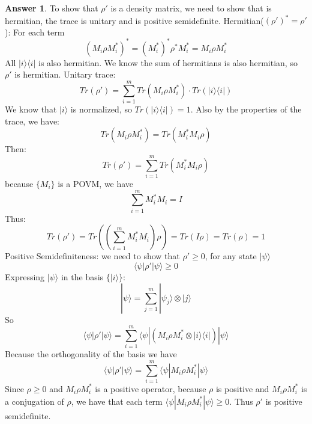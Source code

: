 \documentclass[12pt]{article}
\newcommand{\ket}[1]{|#1\rangle}
\newcommand{\bra}[1]{\langle#1|}
\theoremstyle{plain}
\theoremstyle{definition}
\newtheorem{ans}{Answer}
\begin{document}
\noindent \hrulefill

\begin{ans}
	To show that $\rho'$ is a density matrix, we need to show that is hermitian, the trace is unitary and is positive semidefinite.
    Hermitian($(\rho')^* = \rho'$): For each term
    \[(M_i\rho M_i^*)^* = (M_i^*)^*\rho^*M_i^* = M_i\rho M_i^*\]
    All $\ket{i}\bra{i}$ is also hermitian. We know the sum of hermitians is also hermitian, so $\rho'$ is hermitian.
    Unitary trace: 
    \[Tr(\rho') = \sum_{i=1}^{m} Tr(M_i\rho M_i^*) \cdot Tr(\ket{i}\bra{i})\]
    We know that $\ket{i}$ is normalized, so $Tr(\ket{i}\bra{i}) = 1$. Also
    by the properties of the trace, we have:
    \[Tr(M_i\rho M_i^*) = Tr(M_i^*M_i\rho )\]
    Then:
    \[Tr(\rho') = \sum_{i=1}^{m}Tr(M_i^*M_i\rho )\]
    because $\{ M_i \}$ is a POVM, we have 
    \[\sum_{i=1}^{m}M_i^*M_i = I \]
    Thus:
    \[Tr(\rho') = Tr\left( \left( \sum_{i=1}^{m}M_i^*M_i\right) \rho \right) = Tr(I\rho) = Tr(\rho) =1 \]
    Positive Semidefiniteness: we need to show that $\rho'\geq 0$, for any state
    $\ket{\psi}$
    \[ \bra{\psi}\rho'\ket{\psi} \geq 0\]
    Expressing $\ket{\psi}$ in the basis $\{\ket{i}\}$:
    \[ \ket{\psi} = \sum_{j=1}^{m} \ket{\psi_j} \otimes \ket{j}\]
    So
    \[\bra{\psi}\rho'\ket{\psi} = \sum_{i=1}^{m} \bra{\psi} (M_i\rho M_i^* \otimes \ket{i}\bra{i}) \ket{\psi}\]
    Because the orthogonality of the basis we have
    \[\bra{\psi}\rho'\ket{\psi} = \sum_{i=1}^{m} \bra{\psi} M_i\rho M_i^* \ket{\psi}\]
    Since $\rho \geq 0$ and $M_i\rho M_i^*$ is a positive operator, because $\rho$ is positive
    and $M_i\rho M_i^*$ is a conjugation of $\rho$, we have that each term $\bra{\psi} M_i\rho M_i^* \ket{\psi} \geq 0$.
    Thus $\rho'$ is positive semidefinite. 
\end{ans}

\noindent \hrulefill
\end{document}
